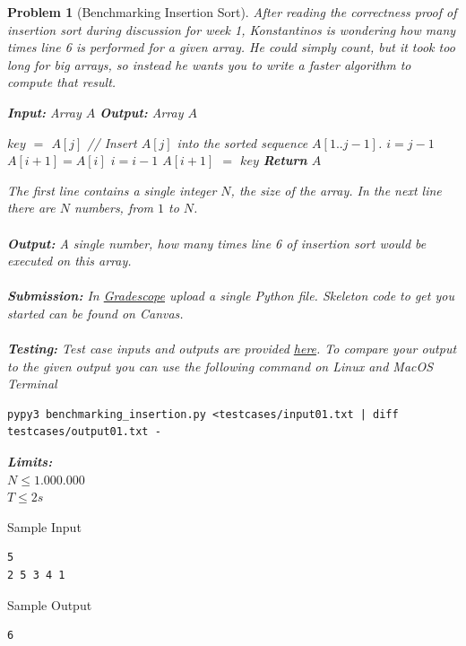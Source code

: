 \documentclass[10pt]{article}
\newtheorem{problem}{\sc\color{cit}Problem}
\begin{document}
\newpage
\begin{problem}[Benchmarking Insertion Sort]

After reading the correctness proof of insertion sort during discussion for week 1, Konstantinos is wondering how many times line 6 is performed for a given array. He could simply count, but it took too long for big arrays, so instead he wants you to write a faster algorithm to compute that result.

\begin{algorithm}
    \caption{Insertion Sort} 
    \begin{algorithmic}[1]
    \Statex \textbf{Input:} Array $A$
    \Statex \textbf{Output:} Array $A$ 
    
        \State $key$ $=$ $A[j]$
        \State // Insert $A[j]$ into the sorted sequence $A[1..j-1]$.
        \State $i = j-1$
            \State $A[i+1] = A[i]$
            \State $i = i - 1$
        \EndWhile
        \State $A[i+1]$ $=$ $key$
    \EndFor
    \State \textbf{Return} $A$
    \end{algorithmic}
\end{algorithm}
 The first line contains a single integer $N$, the size of the array. In the next line there are $N$ numbers, from $1$ to $N$.\\
\\
{\bf Output:} A single number, how many times line 6 of insertion sort would be executed on this array. \\
\\
{\bf Submission:} In \href{https://www.gradescope.com/courses/753885/}{Gradescope} upload a single Python file. Skeleton code to get you started can be found on Canvas. \\
\\
{\bf Testing:} Test case inputs and outputs are provided \href{https://uchicago.box.com/s/ebv1r1sjdrc0hn6nawzbuo6wv5ywq44o}{here}. To compare your output to the given output you can use the following command on Linux and MacOS Terminal
\begin{verbatim}
pypy3 benchmarking_insertion.py <testcases/input01.txt | diff testcases/output01.txt -
\end{verbatim}
{\bf Limits:}\\
$N \leq 1.000.000$\\
$T \leq 2s$
\end{problem}
\begin{minipage}[t]{.20\textwidth}
Sample Input
\begin{verbatim}
5
2 5 3 4 1
\end{verbatim}
\end{minipage}%
\begin{minipage}[t]{.20\textwidth}
Sample Output
\begin{verbatim}
6
\end{verbatim}
\end{minipage}

\vspace{5mm}
\end{document}
